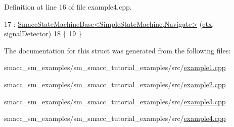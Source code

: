 Definition at line 16 of file example4.\+cpp.


\begin{DoxyCode}
17       : \hyperlink{structsmacc_1_1SmaccStateMachineBase}{SmaccStateMachineBase<SimpleStateMachine,Navigate>}
      (\hyperlink{namespacesmacc__viewer_1_1xdot_1_1xdot__qt_a9f8d32bd9e568c00c10171dc27e9483a}{ctx}, signalDetector)
18       \{
19       \}
\end{DoxyCode}


The documentation for this struct was generated from the following files\+:\begin{DoxyCompactItemize}
\item 
smacc\+\_\+sm\+\_\+examples/sm\+\_\+smacc\+\_\+tutorial\+\_\+examples/src/\hyperlink{example1_8cpp}{example1.\+cpp}\item 
smacc\+\_\+sm\+\_\+examples/sm\+\_\+smacc\+\_\+tutorial\+\_\+examples/src/\hyperlink{example2_8cpp}{example2.\+cpp}\item 
smacc\+\_\+sm\+\_\+examples/sm\+\_\+smacc\+\_\+tutorial\+\_\+examples/src/\hyperlink{example3_8cpp}{example3.\+cpp}\item 
smacc\+\_\+sm\+\_\+examples/sm\+\_\+smacc\+\_\+tutorial\+\_\+examples/src/\hyperlink{example4_8cpp}{example4.\+cpp}\end{DoxyCompactItemize}
